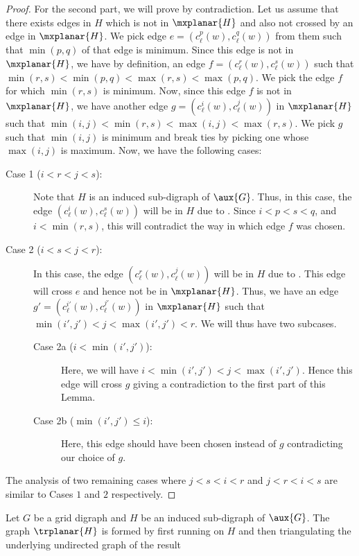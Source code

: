 \documentclass{toc}
\begin{document}
\begin{proof}
For the second part, we will prove by contradiction. Let us assume that there exists edges in $H$ which is not in $\mxplanar{H}$ and also not crossed by an edge in $\mxplanar{H}$. We pick edge $e = (c_{\ell}^p(w), c_{\ell}^q(w))$ from them such that $\min(p, q)$ of that edge is minimum. Since this edge is not %
 in $\mxplanar{H}$, we have by definition, an edge $f = (c_{\ell}^r(w), c_{\ell}^s(w))$ such that $\min(r,s) < \min(p, q) < \max(r, s) < \max(p, q)$. We pick the edge $f$ for which $\min(r,s)$ is minimum. Now, since this edge $f$ is not %
 in $\mxplanar{H}$, we have another edge $g = (c_{\ell}^i(w), c_{\ell}^j(w))$ in $\mxplanar{H}$ such that $\min(i,j) < \min(r, s) < \max(i, j) < \max(r, s)$. We pick $g$ such that $\min(i, j)$ is minimum and break ties by picking one whose $\max(i,j)$ is maximum. Now, we have the following cases:
\begin{description}
\item[Case 1 ($i < r < j < s$):] Note that $H$ is
%
an induced  %
sub-digraph %
 of $\aux{G}$. Thus, in this case, the edge $(c_{\ell}^i(w), c_{\ell}^s(w))$ will be %
 in $H$ due to . Since $i < p < s < q$, and $i< \min(r, s)$, this will contradict the way in which edge $f$ was chosen.
\item[Case 2 ($i < s < j < r$):] In this case, the edge $(c_{\ell}^r(w), c_{\ell}^j(w))$ will be %
 in $H$ due to . This edge will cross $e$ and hence not be %
 in $\mxplanar{H}$. Thus, we have an edge $g' = (c_{\ell}^{i'}(w), c_{\ell}^{j'}(w))$ in $\mxplanar{H}$ such that $\min(i', j') < j < \max(i',j') < r$. We will thus have two subcases.
\begin{description}
\item[Case 2a ($i < \min(i', j')$):] Here, we will have $i < \min(i', j') < j < \max(i', j')$. Hence this edge will cross $g$ giving a contradiction to the first part of this Lemma.
\item[Case 2b ($\min(i', j') \leq i$):] Here, this edge should have been chosen instead of $g$ contradicting our choice of $g$.
\end{description}
\end{description}
The analysis of two remaining cases where $j<s<i<r$ and $j < r < i < s$ are similar to Cases $1$ and $2$ respectively.
\end{proof}


\begin{definition}
Let $G$ be a grid %
digraph %
and $H$ be
%
an induced  %
sub-digraph %
 of $\aux{G}$. The graph $\trplanar{H}$ is formed by first running  on $H$ and then triangulating the %
underlying undirected graph of the result%
\end{definition}
\end{document}
